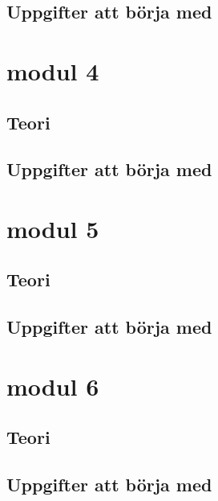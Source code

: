\documentclass{article}
\begin{document}
\subsection{Uppgifter att börja med}


\section{modul 4}
\subsection{Teori}


\subsection{Uppgifter att börja med}


\section{modul 5}
\subsection{Teori}


\subsection{Uppgifter att börja med}


\section{modul 6}
\subsection{Teori}


\subsection{Uppgifter att börja med}
\end{document}
